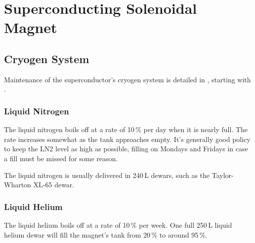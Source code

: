 \chapter{Superconducting Solenoidal Magnet}
\label{sec:op_magnet}


\section{Cryogen System}
\label{sec:op_magnet:cryogens}

Maintenance of the superconductor's cryogen system is detailed in , starting with .

\subsection{Liquid Nitrogen}
\label{sec:op_magnet:cryogens:ln2}

The liquid nitrogen boils off at a rate of 10\,\% per day when it is nearly full.  The rate increases somewhat as the tank approaches empty.  It's generally good policy to keep the LN2 level as high as possible, filling on Mondays and Fridays in case a fill must be missed for some reason.

The liquid nitrogen is usually delivered in 240\,L dewars, such as the Taylor-Wharton XL-65 dewar.

\subsection{Liquid Helium}
\label{sec:op_magnet:cryogens:lhe}

The liquid helium boils off at a rate of 10\,\% per week.  One full 250\,L liquid helium dewar will fill the magnet's tank from 20\,\% to around 95\,\%.  

